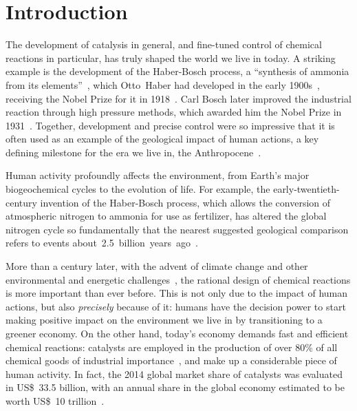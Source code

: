 \chapter*{Introduction}%
\label{ch:introduction}

The development of catalysis in general,
and fine-tuned control of chemical reactions in particular,
has truly shaped the world we live in today.
A striking example is the development of the Haber-Bosch process,
a ``synthesis of ammonia from its elements''~\cite{Nobel_1918},
which Otto~Haber had developed in the early 1900s~\cite{Erisman_2008,Lewis_2015},
receiving the Nobel Prize for it in 1918~\cite{Nobel_1918}.
Carl Bosch later improved the industrial reaction through high pressure methods,
which awarded him the Nobel Prize in 1931~\cite{Nobel_1931}.
Together,
development and precise control were so impressive that it is often used
as an example of the geological impact of human actions,
a key defining milestone for
the era we live in,
the Anthropocene~\cite{Smil_1999,Canfield_2010,Lewis_2015}.
%
\begin{citacao}
	Human activity profoundly affects the environment,
	from Earth’s major biogeochemical cycles to the evolution of life.
	For example,
	the early-twentieth-century invention of the Haber-Bosch process,
	which allows the conversion of atmospheric nitrogen to ammonia for use as fertilizer,
	has altered the global nitrogen cycle so fundamentally
	that the nearest suggested geological comparison refers to events
	about~2.5~billion~years~ago~\cite{Lewis_2015}.
\end{citacao}

More than a century later,
with the advent of climate change and other environmental and energetic challenges~\cite{Bertozzi_2016},
the rational design of chemical reactions is more important than ever before.
This is not only due to the impact of human actions,
but also \emph{precisely} because of it:
humans have the decision power to start making positive impact on the environment we live in
by transitioning to a greener economy.
On the other hand,
today's economy demands fast and efficient chemical reactions:
catalysts are employed in the production of over 80\% of all chemical
goods of industrial
importance~\cite{Breakthrough_Catalyst,GlobalCatalystMarket},
and make up a considerable piece of human activity.
In fact,
the 2014 global market share of catalysts was evaluated in US\$~33.5 billion,
with an annual share in the global economy estimated to be worth US\$~10
trillion~\cite{GlobalCatalystMarket}.

